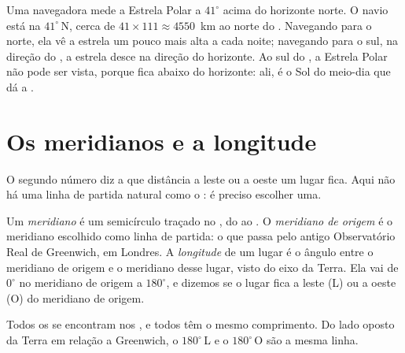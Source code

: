\begin{example}\label{ex:g6:latitude-longitude:pole-star}
Uma navegadora mede a Estrela Polar a $41^\circ$ acima do horizonte norte.
O navio está na  $41^\circ$\,N, cerca de $41 \times 111
\approx \num{4550}$~km ao norte do . Navegando para o norte, ela vê
a estrela um pouco mais alta a cada noite; navegando para o sul, na
direção do , a estrela desce na direção do horizonte. Ao sul do
, a Estrela Polar não pode ser vista, porque fica abaixo do
horizonte: ali, é o Sol do meio-dia que dá a .
\end{example}

\section{Os meridianos e a longitude}

O segundo número diz a que distância a leste ou a oeste um lugar fica.
Aqui não há uma linha de partida natural como o : é preciso escolher
uma.

\begin{definition}\label{def:g6:latitude-longitude:longitude}
Um \emph{meridiano} é um semicírculo traçado no , do
 ao . O \emph{meridiano de origem}
é o meridiano escolhido como linha de partida: o que passa pelo antigo
Observatório Real de Greenwich, em Londres. A
\emph{longitude} de um lugar é o ângulo entre o meridiano
de origem e o meridiano desse lugar, visto do eixo da Terra. Ela vai de
$0^\circ$ no meridiano de origem a $180^\circ$, e dizemos se o lugar fica
a leste (L) ou a oeste (O) do meridiano de origem.
\end{definition}

Todos os  se encontram nos , e todos têm o mesmo
comprimento. Do lado oposto da Terra em relação a Greenwich, o 
$180^\circ$\,L e o  $180^\circ$\,O são a mesma linha.

